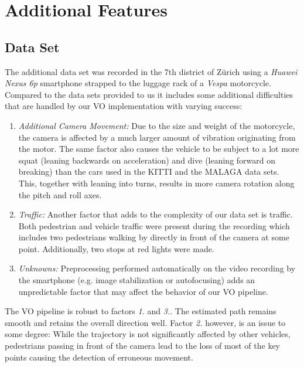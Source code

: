 \chapter{Additional Features}
\section{Data Set}
\label{dataset}

The additional data set was recorded in the 7th district of Zürich using a \emph{Huawei Nexus 6p} smartphone strapped to the luggage rack of a \emph{Vespa} motorcycle. 
Compared to the data sets provided to us it includes some additional difficulties that are handled by our VO implementation with varying success:

\begin{enumerate}
\item \emph{Additional Camera Movement:} Due to the size and weight of the motorcycle, the camera is affected by a much larger amount of vibration originating from the motor. 
The same factor also causes the vehicle to be subject to a lot more squat (leaning backwards on acceleration) and dive (leaning forward on breaking) than the cars used in the KITTI and the MALAGA data sets. 
This, together with leaning into turns, results in more camera rotation along the pitch and roll axes.

\item \emph{Traffic:} Another factor that adds to the complexity of our data set is traffic. 
Both pedestrian and vehicle traffic were present during the recording which includes two pedestrians walking by directly in front of the camera at some point.
Additionally, two stops at red lights were made.

\item \emph{Unknowns:} Preprocessing performed automatically on the video recording by the smartphone (e.g. image stabilization or autofocusing) adds an unpredictable factor that may affect the behavior of our VO pipeline.
\end{enumerate}

The VO pipeline is robust to factors \emph{1.} and \emph{3.}. 
The estimated path remains smooth and retains the overall direction well. 
Factor \emph{2.} however, is an issue to some degree: While the trajectory is not significantly affected by other vehicles, pedestrians passing in front of the camera lead to the loss of most of the key points causing the detection of erroneous movement.

